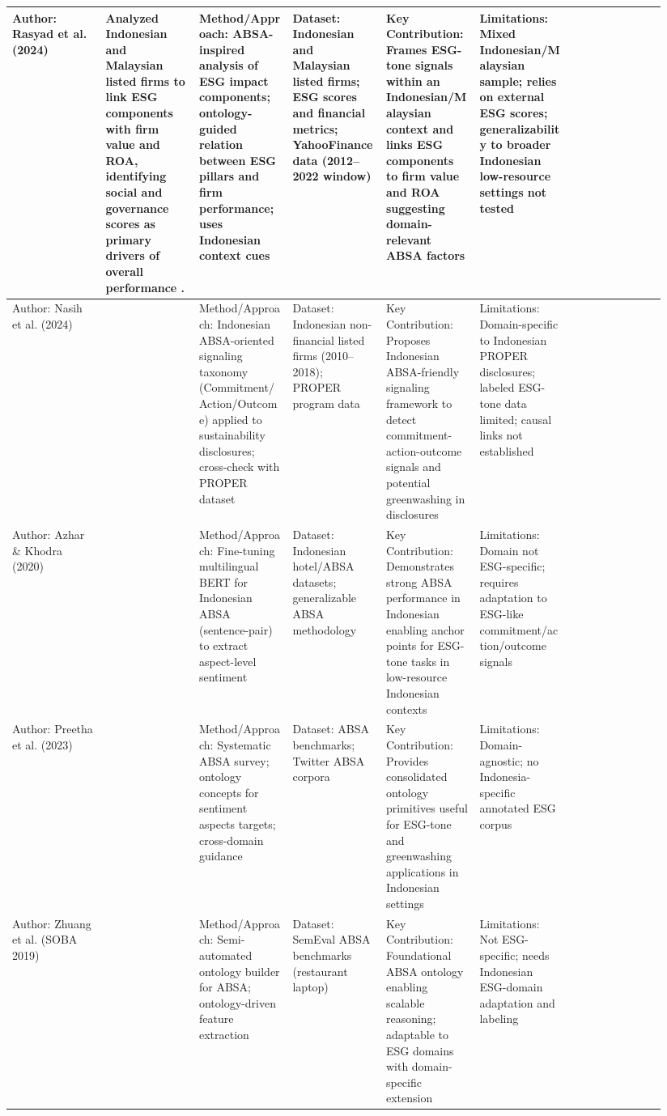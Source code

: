 \documentclass{article}
\begin{document}
\begin{landscape}
\begin{longtable}{p{0.134\linewidth} p{0.134\linewidth} p{0.134\linewidth} p{0.134\linewidth} p{0.134\linewidth} p{0.134\linewidth} p{0.134\linewidth}}
Author: Rasyad et al. (2024) & Analyzed Indonesian and Malaysian listed firms to link ESG components with \textbf{firm value and ROA}, identifying social and governance scores as primary drivers of overall performance  \parencite{rafi_kennaufal_rasyad_596dd17d}. & Method/Approach: ABSA-inspired analysis of ESG impact components; ontology-guided relation between ESG pillars and firm performance; uses Indonesian context cues & Dataset: Indonesian and Malaysian listed firms; ESG scores and financial metrics; YahooFinance data (2012–2022 window) & Key Contribution: Frames ESG-tone signals within an Indonesian/Malaysian context and links ESG components to firm value and ROA suggesting domain-relevant ABSA factors & Limitations: Mixed Indonesian/Malaysian sample; relies on external ESG scores; generalizability to broader Indonesian low-resource settings not tested \\ \hline
Author: Nasih et al. (2024) & ~ & Method/Approach: Indonesian ABSA-oriented signaling taxonomy (Commitment/Action/Outcome) applied to sustainability disclosures; cross-check with PROPER dataset & Dataset: Indonesian non-financial listed firms (2010–2018); PROPER program data & Key Contribution: Proposes Indonesian ABSA-friendly signaling framework to detect commitment-action-outcome signals and potential greenwashing in disclosures & Limitations: Domain-specific to Indonesian PROPER disclosures; labeled ESG-tone data limited; causal links not established \\ \hline
Author: Azhar \& Khodra (2020) & ~ & Method/Approach: Fine-tuning multilingual BERT for Indonesian ABSA (sentence-pair) to extract aspect-level sentiment & Dataset: Indonesian hotel/ABSA datasets; generalizable ABSA methodology & Key Contribution: Demonstrates strong ABSA performance in Indonesian enabling anchor points for ESG-tone tasks in low-resource Indonesian contexts & Limitations: Domain not ESG-specific; requires adaptation to ESG-like commitment/action/outcome signals \\ \hline
Author: Preetha et al. (2023) & ~ & Method/Approach: Systematic ABSA survey; ontology concepts for sentiment aspects targets; cross-domain guidance & Dataset: ABSA benchmarks; Twitter ABSA corpora & Key Contribution: Provides consolidated ontology primitives useful for ESG-tone and greenwashing applications in Indonesian settings & Limitations: Domain-agnostic; no Indonesia-specific annotated ESG corpus \\ \hline
Author: Zhuang et al. (SOBA 2019) & ~ & Method/Approach: Semi-automated ontology builder for ABSA; ontology-driven feature extraction & Dataset: SemEval ABSA benchmarks (restaurant laptop) & Key Contribution: Foundational ABSA ontology enabling scalable reasoning; adaptable to ESG domains with domain-specific extension & Limitations: Not ESG-specific; needs Indonesian ESG-domain adaptation and labeling \\ \hline

\end{longtable}
\end{landscape}
\end{document}
